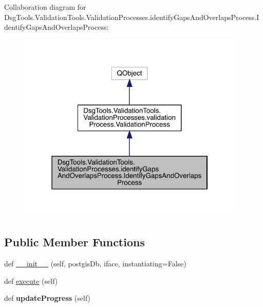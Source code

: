 Collaboration diagram for Dsg\+Tools.\+Validation\+Tools.\+Validation\+Processes.\+identify\+Gaps\+And\+Overlaps\+Process.\+Identify\+Gaps\+And\+Overlaps\+Process\+:
\nopagebreak
\begin{figure}[H]
\begin{center}
\leavevmode
\includegraphics[width=307pt]{class_dsg_tools_1_1_validation_tools_1_1_validation_processes_1_1identify_gaps_and_overlaps_proc1014a81f25c4a25c34754e56569bc871}
\end{center}
\end{figure}
\subsection*{Public Member Functions}
\begin{DoxyCompactItemize}
\item 
def \mbox{\hyperlink{class_dsg_tools_1_1_validation_tools_1_1_validation_processes_1_1identify_gaps_and_overlaps_proc6c71562b24620a794ca7de9d16d249e2_a335e4495aae07871ae2249aa03127844}{\+\_\+\+\_\+init\+\_\+\+\_\+}} (self, postgis\+Db, iface, instantiating=False)
\item 
def \mbox{\hyperlink{class_dsg_tools_1_1_validation_tools_1_1_validation_processes_1_1identify_gaps_and_overlaps_proc6c71562b24620a794ca7de9d16d249e2_ad297412d0a73949f14440cb3a156e946}{execute}} (self)
\item 
\mbox{\label{class_dsg_tools_1_1_validation_tools_1_1_validation_processes_1_1identify_gaps_and_overlaps_proc6c71562b24620a794ca7de9d16d249e2_a5089e6d925f3305851a1ca95c57febbf}} 
def {\bfseries update\+Progress} (self)
\end{DoxyCompactItemize}
